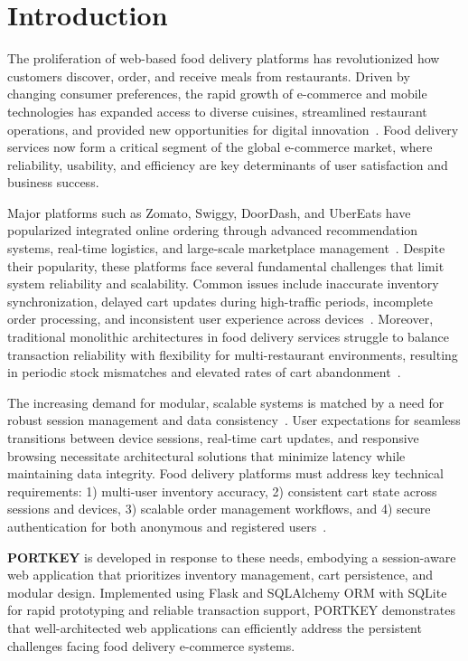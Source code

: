\section{Introduction}
\label{sec:intro}

The proliferation of web-based food delivery platforms has revolutionized how customers discover, order, and receive meals from restaurants. Driven by changing consumer preferences, the rapid growth of e-commerce and mobile technologies has expanded access to diverse cuisines, streamlined restaurant operations, and provided new opportunities for digital innovation~\cite{b7,b8,b9}. Food delivery services now form a critical segment of the global e-commerce market, where reliability, usability, and efficiency are key determinants of user satisfaction and business success.

Major platforms such as Zomato, Swiggy, DoorDash, and UberEats have popularized integrated online ordering through advanced recommendation systems, real-time logistics, and large-scale marketplace management~\cite{b10}. Despite their popularity, these platforms face several fundamental challenges that limit system reliability and scalability. Common issues include inaccurate inventory synchronization, delayed cart updates during high-traffic periods, incomplete order processing, and inconsistent user experience across devices~\cite{b11}. Moreover, traditional monolithic architectures in food delivery services struggle to balance transaction reliability with flexibility for multi-restaurant environments, resulting in periodic stock mismatches and elevated rates of cart abandonment~\cite{b1}.

The increasing demand for modular, scalable systems is matched by a need for robust session management and data consistency~\cite{b12}. User expectations for seamless transitions between device sessions, real-time cart updates, and responsive browsing necessitate architectural solutions that minimize latency while maintaining data integrity. Food delivery platforms must address key technical requirements: 1) multi-user inventory accuracy, 2) consistent cart state across sessions and devices, 3) scalable order management workflows, and 4) secure authentication for both anonymous and registered users~\cite{b2,b13}.

\textbf{PORTKEY} is developed in response to these needs, embodying a session-aware web application that prioritizes inventory management, cart persistence, and modular design. Implemented using Flask and SQLAlchemy ORM with SQLite for rapid prototyping and reliable transaction support, PORTKEY demonstrates that well-architected web applications can efficiently address the persistent challenges facing food delivery e-commerce systems.

